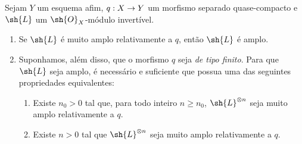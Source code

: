 \documentclass[oneside,10pt]{amsart}
\makeatletter
\renewcommand{\geq}{\geqslant}
\newcommand{\ega@arrow}[2]{\mathchoice{#1}{#2}{#2}{#2}}
\renewcommand{\to}{\ega@arrow{\longrightarrow}{\rightarrow}}
\let\EGAOriginalLabel\label
\renewcommand{\label}[1]{\phantomsection\EGAOriginalLabel{#1}}
\makeatother
\begin{document}
\begin{proposition}[4.5.10]
\label{II.4.5.10}
Sejam $Y$ um esquema afim, $q:X\to Y$ um morfismo separado quase-compacto e $\sh{L}$ um $\sh{O}_X$-módulo invertível.
\begin{enumerate}
  \item[\rm{(i)}] Se $\sh{L}$ é muito amplo relativamente a $q$, então $\sh{L}$ é amplo.
  \item[\rm{(ii)}] Suponhamos, além disso, que o morfismo $q$ seja \emph{de tipo finito}.
    Para que $\sh{L}$ seja amplo, é necessário e suficiente que possua uma das seguintes propriedades equivalentes:
    \begin{enumerate}
      \item[\rm{(e)}] Existe $n_0>0$ tal que, para todo inteiro $n\geq n_0$, $\sh{L}^{\otimes n}$ seja muito amplo relativamente a $q$.
      \item[\rm{(e')}] Existe $n>0$ tal que $\sh{L}^{\otimes n}$ seja muito amplo relativamente a $q$.
    \end{enumerate}
\end{enumerate}
\end{proposition}
\end{document}
